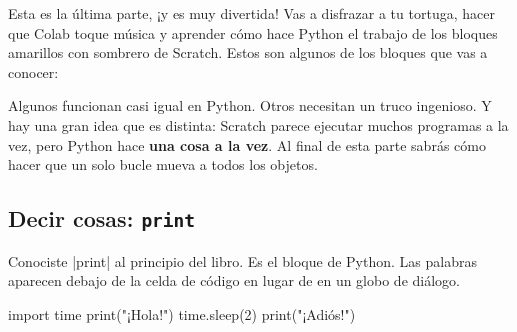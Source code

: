 
Esta es la última parte, ¡y es muy divertida! Vas a disfrazar a tu tortuga, hacer que Colab toque música y aprender cómo hace Python el trabajo de los bloques amarillos con sombrero de Scratch. Estos son algunos de los bloques que vas a conocer:

\begin{center}
\quad
{}\par\vspace{6pt}
\quad
{}\par\vspace{6pt}
\quad
{}\par\vspace{6pt}
\quad
{}\quad
{}
\end{center}

Algunos funcionan casi igual en Python. Otros necesitan un truco ingenioso. Y hay una gran idea que es distinta: Scratch parece ejecutar muchos programas a la vez, pero Python hace \textbf{una cosa a la vez}. Al final de esta parte sabrás cómo hacer que un solo bucle mueva a todos los objetos.

\subsection*{Decir cosas: \texttt{print}}

Conociste \py|print| al principio del libro. Es el bloque  de Python. Las palabras aparecen debajo de la celda de código en lugar de en un globo de diálogo.

\begin{tcbraster}[raster columns=2, raster equal height=rows, raster column skip=12pt, raster valign=center]
\begin{tcolorbox}[colback=white, colframe=white, boxrule=0pt, valign=center]
\begin{scratch}
\end{scratch}
\end{tcolorbox}
\begin{code}
import time
print("¡Hola!")
time.sleep(2)
print("¡Adiós!")
\end{code}
\end{tcbraster}


